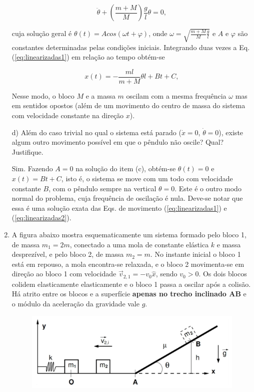 \begin{enumerate}[start=1,label={\bfseries Q\arabic*.}]
$$
\ddot{\theta} + \left( \frac{m+M}{M}  \right) \frac{g}{l} \theta = 0,
$$


cuja solução geral é $\theta (t) = A cos (\omega t + \varphi)$, onde $\omega = \sqrt{\frac{m+M}{M} \frac{g}{l}}$ e $A$ e $\varphi$ são constantes determinadas pelas condições iniciais. Integrando duas vezes a Eq. (\ref{eq:linearizadas1}) em relação ao tempo obtém-se

$$
x(t) = -\frac{ml}{m+M} \theta l + Bt + C,
$$

Nesse modo, o bloco $M$ e a massa $m$ oscilam com a mesma frequência $\omega$ mas em sentidos opostos (além de um movimento do centro de massa do sistema com velocidade constante na direção $x$).



d) Além do caso trivial no qual o sistema está parado ($\dot{x} = 0$, $\dot{\theta} = 0$), existe algum outro movimento possível em que o pêndulo não oscile? Qual? Justifique.

\resposta

Sim. Fazendo $A = 0$ na solução do item (c), obtém-se $\theta(t) = 0$ e $x(t) = Bt + C$, isto é, o sistema se move com um todo com velocidade constante $B$, com o pêndulo sempre na vertical $\theta = 0$. Este é o outro modo normal do problema, cuja frequência de oscilação é nula. Deve-se notar que essa é uma solução exata das Eqs. de movimento (\ref{eq:linearizadas1}) e (\ref{eq:linearizadas2}).






\item A figura abaixo mostra esquematicamente um sistema formado pelo bloco 1, de massa $m_{1} = 2m$, conectado a uma mola de constante elástica $k$ e massa desprezível, e pelo bloco 2, de massa $m_{2} = m$. No instante inicial o bloco 1 está em repouso, a mola encontra-se relaxada, e o bloco 2 movimenta-se em direção ao bloco 1 com velocidade $\vec{v}_{2,1} = - v_{0} \hat{x}$, sendo $v_{0} > 0$. Os dois blocos colidem elasticamente elasticamente e o bloco 1 passa a oscilar após a colisão. Há atrito entre os blocos e a superfície \textbf{apenas no trecho inclinado AB} e o módulo da aceleração da gravidade vale $g$.

\begin{figure}[H]
\centering
\includegraphics[scale=0.5]{classica-img/inclinado.png}
\end{figure}



\end{enumerate}
